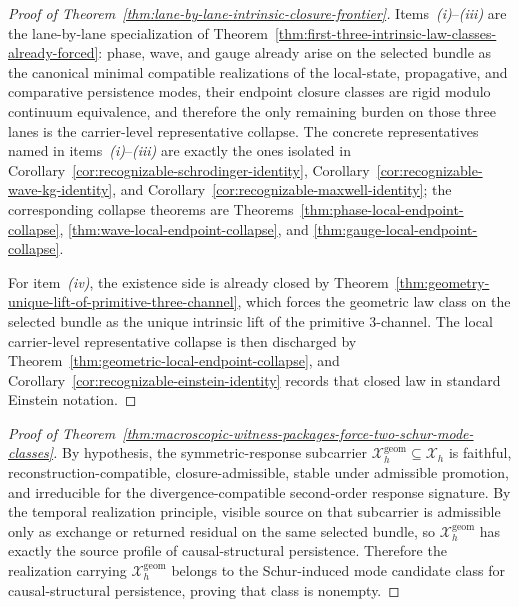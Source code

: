 \begin{proof}[Proof of Theorem~\ref{thm:lane-by-lane-intrinsic-closure-frontier}]
\label{proof:thm:lane-by-lane-intrinsic-closure-frontier}
Items~\emph{(i)}--\emph{(iii)} are the lane-by-lane specialization of
Theorem~\ref{thm:first-three-intrinsic-law-classes-already-forced}: phase,
wave, and gauge already arise on the selected bundle as the canonical minimal
compatible realizations of the local-state, propagative, and comparative
persistence modes, their endpoint closure classes are rigid modulo continuum
equivalence, and therefore the only remaining burden on those three lanes is
the carrier-level representative collapse. The concrete representatives named
in items~\emph{(i)}--\emph{(iii)} are exactly the ones isolated in
Corollary~\ref{cor:recognizable-schrodinger-identity},
Corollary~\ref{cor:recognizable-wave-kg-identity}, and
Corollary~\ref{cor:recognizable-maxwell-identity}; the corresponding collapse
theorems are
Theorems~\ref{thm:phase-local-endpoint-collapse},
\ref{thm:wave-local-endpoint-collapse}, and
\ref{thm:gauge-local-endpoint-collapse}.

For item~\emph{(iv)}, the existence side is already closed by
Theorem~\ref{thm:geometry-unique-lift-of-primitive-three-channel}, which
forces the geometric law class on the selected bundle as the unique intrinsic
lift of the primitive \(3\)-channel. The local carrier-level representative
collapse is then discharged by
Theorem~\ref{thm:geometric-local-endpoint-collapse}, and
Corollary~\ref{cor:recognizable-einstein-identity} records that closed law in
standard Einstein notation.
\end{proof}

\begin{proof}[Proof of Theorem~\ref{thm:macroscopic-witness-packages-force-two-schur-mode-classes}]
\label{proof:thm:macroscopic-witness-packages-force-two-schur-mode-classes}
By hypothesis, the symmetric-response subcarrier
\(\mathcal X_h^{\mathrm{geom}}\subseteq \mathcal X_h\) is faithful,
reconstruction-compatible, closure-admissible, stable under admissible
promotion, and irreducible for the divergence-compatible second-order response
signature. By the temporal realization principle, visible source on that
subcarrier is admissible only as exchange or returned residual on the same
selected bundle, so \(\mathcal X_h^{\mathrm{geom}}\) has exactly the source
profile of causal-structural persistence. Therefore the realization carrying
\(\mathcal X_h^{\mathrm{geom}}\) belongs to the Schur-induced mode candidate
class for causal-structural persistence, proving that class is nonempty.
\end{proof}

